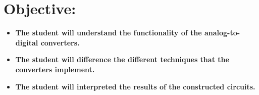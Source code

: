 \section{Objective:}

\begin{itemize}
\item {\bfseries The student will understand the functionality of the analog-to-digital converters.}
\item {\bfseries The student will difference the different techniques that the converters implement.} 
\item {\bfseries The student will interpreted the results of the constructed circuits.} 
\end{itemize} 

\pagebreak